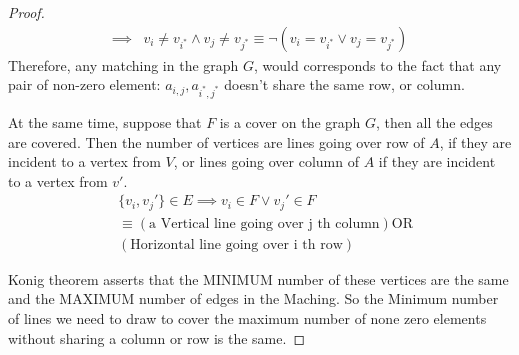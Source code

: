 \documentclass[]{article}
\theoremstyle{definition}
\begin{document}
\begin{proof}
\begin{align}
            \implies & 
            v_i \neq v_{i^*} \wedge v_j \neq v_{j^*}
            \equiv \neg (v_i = v_{i^*} \vee v_j = v_{j^*})
        \end{align}
        Therefore, any matching in the graph $G$, would corresponds to the fact that any pair of non-zero element: $a_{i, j}, a_{i^*, j^*}$ doesn't share the same row, or column. 
        \par
        At the same time, suppose that $F$ is a cover on the graph $G$, then all the edges are covered. Then the number of vertices are lines going over row of $A$, if they are incident to a vertex from $V$, or lines going over column of $A$ if they are incident to a vertex from $v'$. 
        \begin{align}
            & \{v_i, v_j'\} \in E \implies  v_i \in F \vee v_j' \in F
            \\
            & \equiv (\text{a Vertical line going over j th column}) \text{OR}
            \\
            & (\text{Horizontal line going over i th row})
        \end{align}
        
        Konig theorem asserts that the MINIMUM number of these vertices are the same and the MAXIMUM number of edges in the Maching. So the Minimum number of lines we need to draw to cover the maximum number of none zero elements without sharing a column or row is the same. 

        
    \end{proof}
\end{document}

